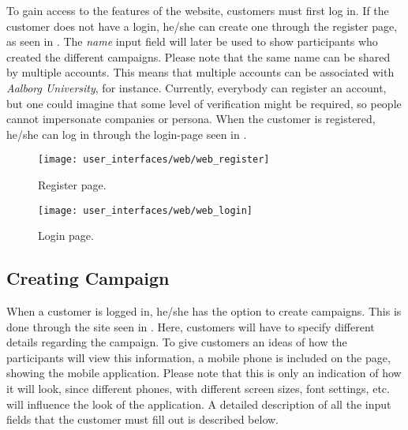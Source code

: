 To gain access to the features of the website, customers must first log in. If the customer does not have a login, he/she can create one through the register page, as seen in . The \emph{name} input field will later be used to show participants who created the different campaigns. Please note that the same name can be shared by multiple accounts. This means that multiple accounts can be associated with \emph{Aalborg University}, for instance. Currently, everybody can register an account, but one could imagine that some level of verification might be required, so people cannot impersonate companies or persona. When the customer is registered, he/she can log in through the login-page seen in .  

\begin{figure}[!htbp]
\centering
\texttt{[image: user\_interfaces/web/web\_register]}
\caption{Register page.}
\label{fig:web_register}
\end{figure}
\FloatBarrier

\begin{figure}[!htbp]
\centering
\texttt{[image: user\_interfaces/web/web\_login]}
\caption{Login page.}
\label{fig:web_login}
\end{figure}
\FloatBarrier

\subsection{Creating Campaign}
\label{sub:creating_campaign}

When a customer is logged in, he/she has the option to create campaigns. This is done through the site seen in . Here, customers will have to specify different details regarding the campaign. To give customers an ideas of how the participants will view this information, a mobile phone is included on the page, showing the mobile application. Please note that this is only an indication of how it will look, since different phones, with different screen sizes, font settings, etc. will influence the look of the application. A detailed description of all the input fields that the customer must fill out is described below.

